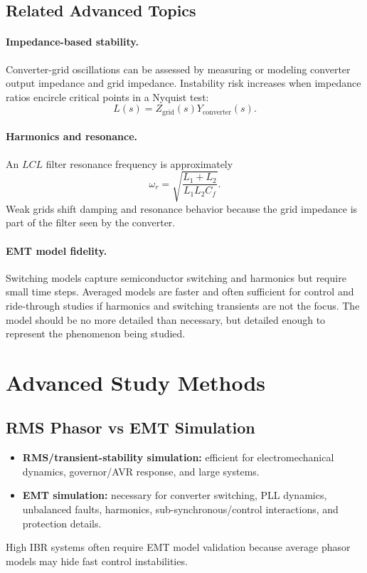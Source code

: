 \documentclass[11pt]{article}
\begin{document}
\subsection{Related Advanced Topics}
\paragraph{Impedance-based stability.}
Converter-grid oscillations can be assessed by measuring or modeling converter
output impedance and grid impedance. Instability risk increases when impedance
ratios encircle critical points in a Nyquist test:
\begin{equation}
L(s)=Z_{\mathrm{grid}}(s)Y_{\mathrm{converter}}(s).
\end{equation}

\paragraph{Harmonics and resonance.}
An $LCL$ filter resonance frequency is approximately
\begin{equation}
\omega_r=\sqrt{\frac{L_1+L_2}{L_1L_2C_f}}.
\end{equation}
Weak grids shift damping and resonance behavior because the grid impedance is
part of the filter seen by the converter.

\paragraph{EMT model fidelity.}
Switching models capture semiconductor switching and harmonics but require small
time steps. Averaged models are faster and often sufficient for control and
ride-through studies if harmonics and switching transients are not the focus.
The model should be no more detailed than necessary, but detailed enough to
represent the phenomenon being studied.

\section{Advanced Study Methods}

\subsection{RMS Phasor vs EMT Simulation}
\begin{itemize}
  \item \textbf{RMS/transient-stability simulation:} efficient for electromechanical
  dynamics, governor/AVR response, and large systems.
  \item \textbf{EMT simulation:} necessary for converter switching, PLL dynamics,
  unbalanced faults, harmonics, sub-synchronous/control interactions, and
  protection details.
\end{itemize}
High IBR systems often require EMT model validation because average phasor models
may hide fast control instabilities.
\end{document}
